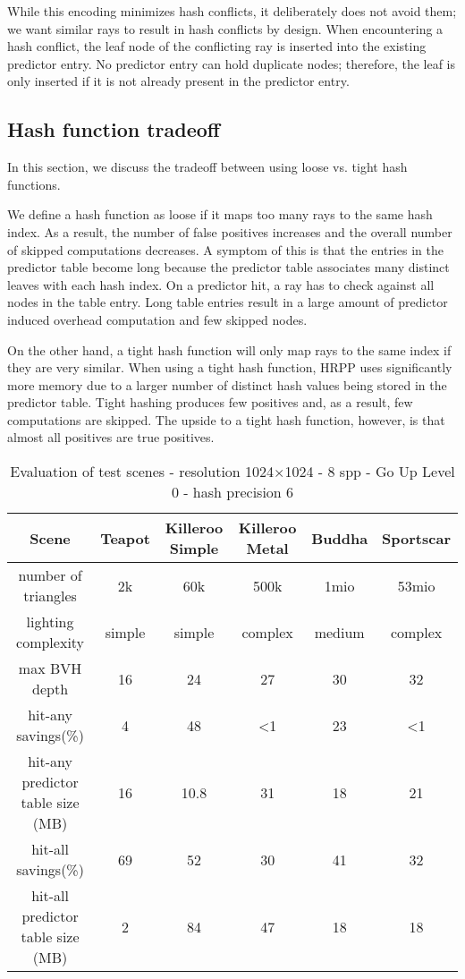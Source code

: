 While this encoding minimizes hash conflicts, it deliberately does not avoid them; we want similar rays to result in hash conflicts by design.
When encountering a hash conflict, the leaf node of the conflicting ray is inserted into the existing predictor entry. No predictor entry can hold duplicate nodes; therefore, the leaf is only inserted if it is not already present in the predictor entry. 

\subsection{Hash function tradeoff}
In this section, we discuss the tradeoff between using loose vs. tight hash functions.

We define a hash function as loose if it maps too many rays to the same hash index. As a result, the number of false positives increases and the overall number of skipped computations decreases. A symptom of this is that the entries in the predictor table become long because the predictor table associates many distinct leaves with each hash index. On a predictor hit, a ray has to check against all nodes in the table entry. Long table entries result in a large amount of predictor induced overhead computation and few skipped nodes. 

On the other hand, a tight hash function will only map rays to the same index if they are very similar. When using a tight hash function, HRPP uses significantly more memory due to a larger number of distinct hash values being stored in the predictor table. Tight hashing produces few positives and, as a result, few computations are skipped. The upside to a tight hash function, however, is that almost all positives are true positives.  

%
%

\begin{table*}[t]
\centering
\begin{tabular}{ |c||c|c|c|c|c|  }
 \hline
 Scene & Teapot & Killeroo Simple & Killeroo Metal & Buddha & Sportscar\\
 \hline
 number of triangles              & 2k & 60k & 500k & 1mio & 53mio\\
 lighting complexity              & simple & simple & complex & medium & complex\\
 max BVH depth                    & 16 & 24 & 27 & 30 & 32\\
 hit-any savings(\%)              & 4 & 48 & \textless1 & 23 & \textless1\\
 hit-any predictor table size (MB)& 16 & 10.8 & 31 & 18 & 21\\
 hit-all savings(\%)              & 69 & 52 & 30 & 41 & 32\\
 hit-all predictor table size (MB)& 2 & 84 & 47 & 18 & 18\\
 \hline
\end{tabular}
\caption{Evaluation of test scenes - resolution 1024$\times$1024 - 8 spp - Go Up Level 0 - hash precision 6}
\label{tab:table_label}
\end{table*}


